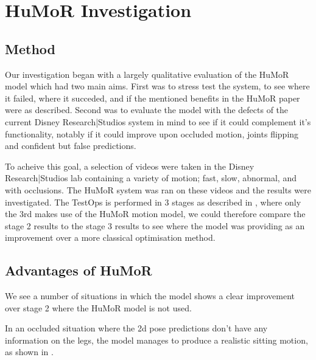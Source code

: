 \section{HuMoR Investigation}
\label{sec:humor_investigation}

\subsection{Method}
Our investigation began with a largely qualitative evaluation of the HuMoR model which had two main aims.  First was to stress test the system, to see where it failed, where it succeded, and if the mentioned benefits in the HuMoR paper \cite{humor} were as described.  Second was to evaluate the model with the defects of the current Disney Research|Studios system in mind to see if it could complement it's functionality, notably if it could improve upon occluded motion, joints flipping and confident but false predictions.

To acheive this goal, a selection of videos were taken in the Disney Research|Studios lab containing a variety of motion; fast, slow, abnormal, and with occlusions. The HuMoR system was ran on these videos and the results were investigated. The TestOps is performed in 3 stages as described in , where only the 3rd makes use of the HuMoR motion model, we could therefore compare the stage 2 results to the stage 3 results to see where the model was providing as an improvement over a more classical optimisation method.

\subsection{Advantages of HuMoR}
We see a number of situations in which the model shows a clear improvement over stage 2 where the HuMoR model is not used.

In an occluded situation where the 2d pose predictions don't have any information on the legs, the model manages to produce a realistic sitting motion, as shown in .

